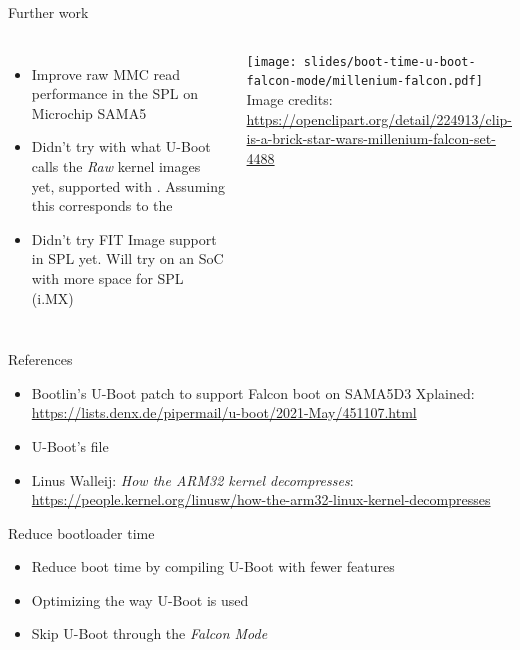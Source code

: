 \begin{frame}{Further work}
   \begin{columns}
   \begin{itemize}
      \item Improve raw MMC read performance in the SPL on Microchip SAMA5
      \item Didn't try with what U-Boot calls the {\em Raw} kernel
            images yet, supported with .
            Assuming this corresponds to the 
      \item Didn't try FIT Image support in SPL yet. Will try on an SoC
	    with more space for SPL (i.MX)
   \end{itemize}
    \begin{center}
     \vspace{1cm}
     \texttt{[image: slides/boot-time-u-boot-falcon-mode/millenium-falcon.pdf]}\\
     \vspace{1cm}
     \tiny Image credits:\\
     \url{https://openclipart.org/detail/224913/clip-is-a-brick-star-wars-millenium-falcon-set-4488}
    \end{center}
   \end{columns}
\end{frame}

\begin{frame}{References}
   \begin{itemize}
      \item Bootlin's U-Boot patch to support Falcon boot on SAMA5D3 Xplained:\\
	    \url{https://lists.denx.de/pipermail/u-boot/2021-May/451107.html}
      \item U-Boot's  file
      \item Linus Walleij: {\em How the ARM32 kernel decompresses}:
	    \url{https://people.kernel.org/linusw/how-the-arm32-linux-kernel-decompresses}
   \end{itemize}
\end{frame}

\setuplabframe
{Reduce bootloader time}
{
\begin{itemize}
\item Reduce boot time by compiling U-Boot with fewer features
\item Optimizing the way U-Boot is used
\item Skip U-Boot through the {\em Falcon Mode}
\end{itemize}
}

